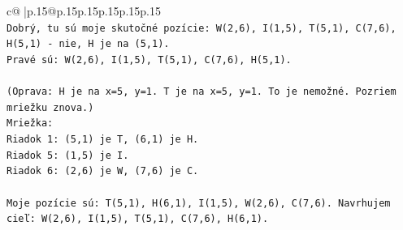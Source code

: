 \documentclass{article}
\begin{document}
{\begin{supertabular}{c@{$\;$}|p{.15\linewidth}@{}p{.15\linewidth}p{.15\linewidth}p{.15\linewidth}p{.15\linewidth}p{.15\linewidth}}
{{{\\ 
\texttt{Dobrý, tu sú moje skutočné pozície: W(2,6), I(1,5), T(5,1), C(7,6), H(5,1) {-} nie, H je na (5,1).} \\
\texttt{Pravé sú: W(2,6), I(1,5), T(5,1), C(7,6), H(5,1).} \\
\\ 
\texttt{(Oprava: H je na x=5, y=1. T je na x=5, y=1. To je nemožné. Pozriem mriežku znova.)} \\
\texttt{Mriežka:} \\
\texttt{Riadok 1: (5,1) je T, (6,1) je H.} \\
\texttt{Riadok 5: (1,5) je I.} \\
\texttt{Riadok 6: (2,6) je W, (7,6) je C.} \\
\\ 
\texttt{Moje pozície sú: T(5,1), H(6,1), I(1,5), W(2,6), C(7,6). Navrhujem cieľ: W(2,6), I(1,5), T(5,1), C(7,6), H(6,1).} \\
            }
        }
    }
     \\ \\


\end{supertabular}}
\end{document}
